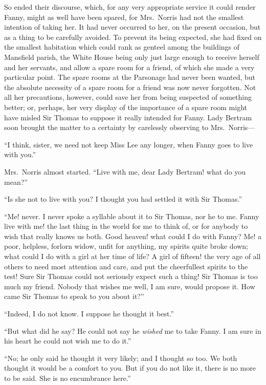 So ended their discourse, which, for any very appropriate
service it could render Fanny, might as well have been spared,
for Mrs.\ Norris had not the smallest intention of taking her.
It had never occurred to her, on the present occasion,
but as a thing to be carefully avoided.  To prevent its
being expected, she had fixed on the smallest habitation
which could rank as genteel among the buildings of Mansfield
parish, the White House being only just large enough to
receive herself and her servants, and allow a spare room
for a friend, of which she made a very particular point.
The spare rooms at the Parsonage had never been wanted,
but the absolute necessity of a spare room for a friend
was now never forgotten.  Not all her precautions, however,
could save her from being suspected of something better;
or, perhaps, her very display of the importance of a
spare room might have misled Sir Thomas to suppose it
really intended for Fanny.  Lady Bertram soon brought
the matter to a certainty by carelessly observing to Mrs.\ Norris---%

``I think, sister, we need not keep Miss Lee any longer,
when Fanny goes to live with you.''

Mrs.\ Norris almost started.  ``Live with me, dear Lady
Bertram! what do you mean?''

``Is she not to live with you?  I thought you had settled
it with Sir Thomas.''

``Me! never.  I never spoke a syllable about it to Sir Thomas,
nor he to me.  Fanny live with me! the last thing in the
world for me to think of, or for anybody to wish that really
knows us both.  Good heaven! what could I do with Fanny?
Me! a poor, helpless, forlorn widow, unfit for anything,
my spirits quite broke down; what could I do with a girl
at her time of life?  A girl of fifteen! the very age
of all others to need most attention and care, and put
the cheerfullest spirits to the test!  Sure Sir Thomas
could not seriously expect such a thing!  Sir Thomas is too
much my friend.  Nobody that wishes me well, I am sure,
would propose it.  How came Sir Thomas to speak to you
about it?''

``Indeed, I do not know.  I suppose he thought it best.''

``But what did he say?  He could not say he \emph{wished} me
to take Fanny.  I am sure in his heart he could not wish
me to do it.''

``No; he only said he thought it very likely; and I thought
so too.  We both thought it would be a comfort to you.
But if you do not like it, there is no more to be said.
She is no encumbrance here.''

